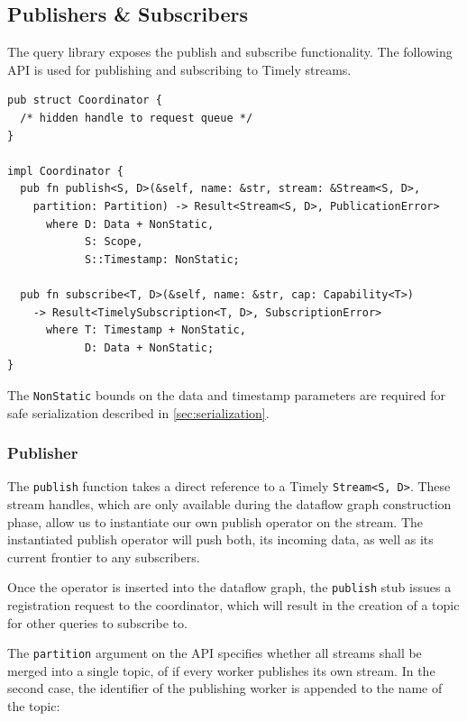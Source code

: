 \subsection{Publishers \& Subscribers}

The query library exposes the publish and subscribe functionality. The following
API is used for publishing and subscribing to Timely streams.

\begin{lstlisting}[caption={[Publish \& subscribe interface]
The interface for publishing and subscribing Timely streams.
}]
pub struct Coordinator {
  /* hidden handle to request queue */
}

impl Coordinator {
  pub fn publish<S, D>(&self, name: &str, stream: &Stream<S, D>,
    partition: Partition) -> Result<Stream<S, D>, PublicationError>
      where D: Data + NonStatic, 
            S: Scope,
            S::Timestamp: NonStatic;

  pub fn subscribe<T, D>(&self, name: &str, cap: Capability<T>) 
    -> Result<TimelySubscription<T, D>, SubscriptionError>
      where T: Timestamp + NonStatic, 
            D: Data + NonStatic;
}
\end{lstlisting}

The \lstinline{NonStatic} bounds on the data and timestamp
parameters are required for safe serialization described in \ref{sec:serialization}.

\subsubsection{Publisher}

The \lstinline{publish} function takes a direct reference to a Timely
\lstinline{Stream<S, D>}. These stream handles, which are only available during
the dataflow graph construction phase, allow us to instantiate our own publish
operator on the stream.  The instantiated publish operator will push both, its
incoming data, as well as its current frontier to any subscribers. 

Once the operator is inserted into the dataflow graph, the \lstinline{publish}
stub issues a registration request to the coordinator, which will result in the
creation of a topic for other queries to subscribe to.

The \lstinline{partition} argument on the API specifies whether all streams
shall be merged into a single topic, of if every worker publishes its own stream.
In the second case, the identifier of the publishing worker is appended to the
name of the topic:

